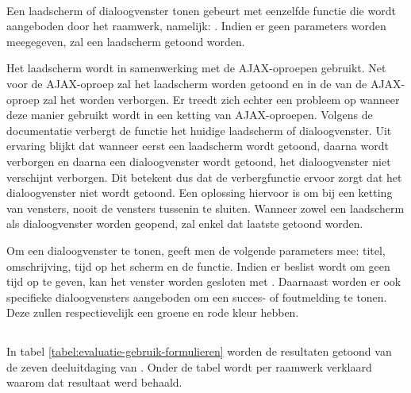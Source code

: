 \paragraph{\lungo}
Een laadscherm of dialoogvenster tonen gebeurt met eenzelfde functie die wordt aangeboden door het raamwerk, namelijk: .
Indien er geen parameters worden meegegeven, zal een laadscherm getoond worden.

Het laadscherm wordt in samenwerking met de AJAX-oproepen gebruikt.
Net voor de AJAX-oproep zal het laadscherm worden getoond en in de  van de AJAX-oproep zal het worden verborgen.
Er treedt zich echter een probleem op wanneer deze manier gebruikt wordt in een ketting van AJAX-oproepen.
Volgens de documentatie verbergt de functie  het huidige laadscherm of dialoogvenster. 
Uit ervaring blijkt dat wanneer eerst een laadscherm wordt getoond, daarna wordt verborgen en daarna een dialoogvenster wordt getoond, het dialoogvenster niet verschijnt verborgen.
Dit betekent dus dat de verbergfunctie ervoor zorgt dat het dialoogvenster niet wordt getoond.
Een oplossing hiervoor is om bij een ketting van vensters, nooit de vensters tussenin te sluiten.
Wanneer zowel een laadscherm als dialoogvenster worden geopend, zal enkel dat laatste getoond worden.

Om een dialoogvenster te tonen, geeft men de volgende parameters mee: titel, omschrijving, tijd op het scherm en de  functie.
Indien er beslist wordt om geen tijd op te geven, kan het venster worden gesloten met .
Daarnaast worden er ook specifieke dialoogvensters aangeboden om een succes- of foutmelding te tonen.
Deze zullen respectievelijk een groene en rode kleur hebben.



\subsection{}
\label{sec:evaluatie-gebruik-formulieren}

In tabel \ref{tabel:evaluatie-gebruik-formulieren} worden de resultaten getoond van de zeven deeluitdaging van .
Onder de tabel wordt per raamwerk verklaard waarom dat resultaat werd behaald.

